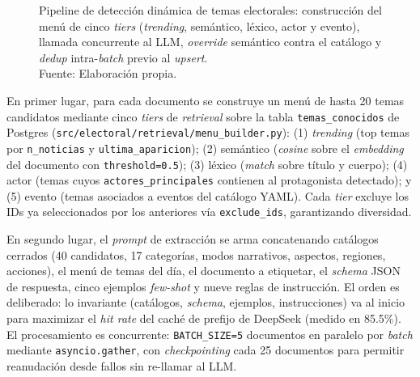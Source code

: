 \documentclass[listof=nochaptergap,12pt,times,authoryear]{report}
\begin{document}
\begin{figure}[!ht]
\begin{center}

        \caption[Pipeline de detección dinámica de temas con LLM y retrieval multinivel]{Pipeline de detección dinámica de temas electorales: construcción del menú de cinco \textit{tiers} (\textit{trending}, semántico, léxico, actor y evento), llamada concurrente al LLM, \textit{override} semántico contra el catálogo y \textit{dedup} intra-\textit{batch} previo al \textit{upsert}.\\
            Fuente: Elaboración propia.}
        \label{5:fig18}
    \end{center}
\end{figure}

En primer lugar, para cada documento se construye un menú de hasta 20 temas
candidatos mediante cinco \textit{tiers} de \textit{retrieval} sobre la tabla
\texttt{temas\_conocidos} de Postgres
(\texttt{src/electoral/retrieval/menu\_builder.py}): (1) \textit{trending} (top
temas por \texttt{n\_noticias} y \texttt{ultima\_aparicion}); (2) semántico
(\textit{cosine} sobre el \textit{embedding} del documento con \texttt{threshold=0.5});
(3) léxico (\textit{match} sobre título y cuerpo); (4) actor (temas cuyos
\texttt{actores\_principales} contienen al protagonista detectado); y (5) evento
(temas asociados a eventos del catálogo YAML). Cada \textit{tier} excluye los IDs
ya seleccionados por los anteriores vía \texttt{exclude\_ids}, garantizando
diversidad.

En segundo lugar, el \textit{prompt} de extracción se arma concatenando catálogos
cerrados (40 candidatos, 17 categorías, modos narrativos, aspectos, regiones,
acciones), el menú de temas del día, el documento a etiquetar, el \textit{schema}
JSON de respuesta, cinco ejemplos \textit{few-shot} y nueve reglas de
instrucción. El orden es deliberado: lo invariante (catálogos, \textit{schema},
ejemplos, instrucciones) va al inicio para maximizar el \textit{hit rate} del
caché de prefijo de DeepSeek (medido en 85.5\%). El procesamiento es concurrente:
\texttt{BATCH\_SIZE=5} documentos en paralelo por \textit{batch} mediante
\texttt{asyncio.gather}, con \textit{checkpointing} cada 25 documentos para
permitir reanudación desde fallos sin re-llamar al LLM.
\end{document}
